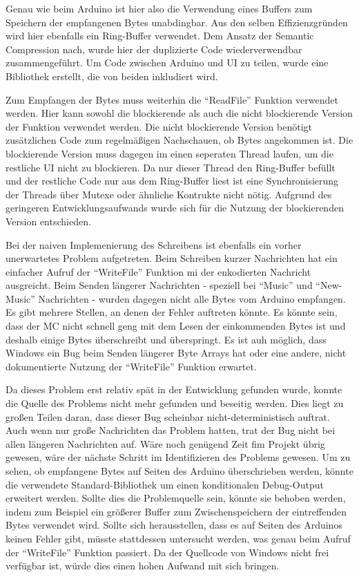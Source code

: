 Genau wie beim Arduino ist hier also die Verwendung eines Buffers zum Speichern der empfangenen Bytes unabdingbar.
Aus den selben Effizienzgründen wird hier ebenfalls ein Ring-Buffer verwendet.
Dem Ansatz der Semantic Compression nach, wurde hier der duplizierte Code wiederverwendbar zusammengeführt.
Um Code zwischen Arduino und \ac{UI} zu teilen, wurde eine Bibliothek erstellt, die von beiden inkludiert wird.

Zum Empfangen der Bytes muss weiterhin die \enquote{ReadFile} Funktion verwendet werden.
Hier kann sowohl die blockierende als auch die nicht blockierende Version der Funktion verwendet werden.
Die nicht blockierende Version benötigt zusätzlichen Code zum regelmäßigen Nachschauen, ob Bytes angekommen ist.
Die blockierende Version muss dagegen im einen seperaten Thread laufen, um die restliche \ac{UI} nicht zu blockieren.
Da nur dieser Thread den Ring-Buffer befüllt und der restliche Code nur aus dem Ring-Buffer liest ist eine Synchronisierung der Threads über Mutexe oder ähnliche Kontrukte nicht nötig.
Aufgrund des geringeren Entwicklungsaufwands wurde sich für die Nutzung der blockierenden Version entschieden.

Bei der naiven Implemenierung des Schreibens ist ebenfalls ein vorher unerwartetes Problem aufgetreten.
Beim Schreiben kurzer Nachrichten hat ein einfacher Aufruf der \enquote{WriteFile} Funktion mi der enkodierten Nachricht ausgreicht.
Beim Senden längerer Nachrichten - speziell bei \enquote{Music} und \enquote{New-Music} Nachrichten - wurden dagegen nicht alle Bytes vom Arduino empfangen.
Es gibt mehrere Stellen, an denen der Fehler auftreten könnte.
Es könnte sein, dass der \ac{MC} nicht schnell geng mit dem Lesen der einkommenden Bytes ist und deshalb einige Bytes überschreibt und überspringt.
Es ist auh möglich, dass Windows ein Bug beim Senden längerer Byte Arrays hat oder eine andere, nicht dokumentierte Nutzung der \enquote{WriteFile} Funktion erwartet.

Da dieses Problem erst relativ spät in der Entwicklung gefunden wurde, konnte die Quelle des Problems nicht mehr gefunden und beseitig werden.
Dies liegt zu großen Teilen daran, dass dieser Bug scheinbar nicht-deterministisch auftrat.
Auch wenn nur große Nachrichten das Problem hatten, trat der Bug nicht bei allen längeren Nachrichten auf.
Wäre noch genügend Zeit fim Projekt übrig gewesen, wäre der nächste Schritt im Identifizieren des Problems gewesen.
Um zu sehen, ob empfangene Bytes auf Seiten des Arduino überschrieben werden, könnte die verwendete Standard-Bibliothek um einen konditionalen Debug-Output erweitert werden.
Sollte dies die Problemquelle sein, könnte sie behoben werden, indem zum Beispiel ein größerer Buffer zum Zwischenspeichern der eintreffenden Bytes verwendet wird.
Sollte sich herausstellen, dass es auf Seiten des Arduinos keinen Fehler gibt, müsste stattdessen untersucht werden, was genau beim Aufruf der \enquote{WriteFile} Funktion passiert.
Da der Quellcode von Windows nicht frei verfügbar ist, würde dies einen hohen Aufwand mit sich bringen.

